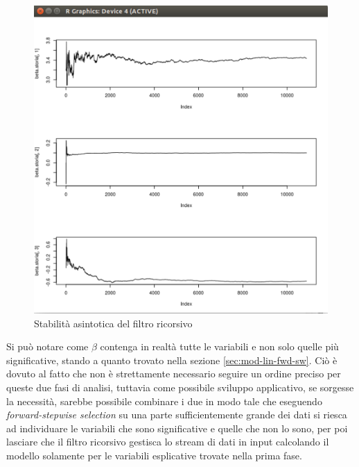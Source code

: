 \begin{figure}[H]
  \centering
  \includegraphics[width=.55\columnwidth]{images/kalman-asymptotic.eps}
  \caption{Stabilità asintotica del filtro ricorsivo}
    \label{fig:kalman-asymptotic}
\end{figure}

Si può notare come $ \beta{} $ contenga in realtà tutte le variabili e non solo
quelle più significative, stando a quanto trovato nella sezione
\ref{sec:mod-lin-fwd-sw}. Ciò è dovuto al fatto che non è strettamente
necessario seguire un ordine preciso per queste due fasi di analisi, tuttavia
come possibile sviluppo applicativo, se sorgesse la necessità, sarebbe
possibile combinare i due in modo tale che eseguendo \emph{forward-stepwise
selection} su una parte sufficientemente grande dei dati si riesca ad
individuare le variabili che sono significative e quelle che non lo sono, per
poi lasciare che il filtro ricorsivo gestisca lo stream di dati in input
calcolando il modello solamente per le variabili esplicative trovate nella
prima fase.
